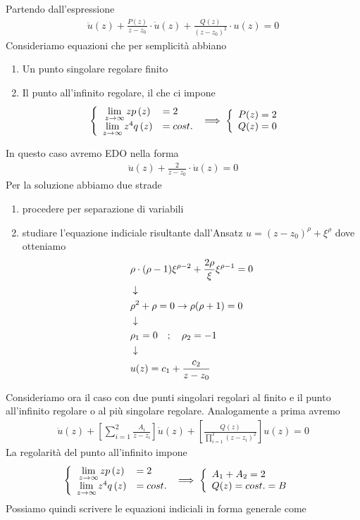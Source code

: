Partendo dall'espressione
\begin{align}
	\ddot{u}(z) + \frac{P(z)}{z-z_0}\cdot \dot{u}(z) + \frac{Q(z)}{(z-z_0)^2} \cdot u(z)=0 
\end{align}
Consideriamo equazioni che per semplicità abbiano
\begin{enumerate}
	\item Un punto singolare regolare finito
	\item Il punto all'infinito regolare, il che ci impone
	\begin{align}
		\double{\limit{z}{\infty}zp\left(z\right) &= 2 \hfill}{\limit{z}{\infty} z^4 q\left(z\right) &= cost.} &\implies \double{P(z) = 2}{Q(z)= 0}   
	\end{align}
\end{enumerate}
In questo caso avremo EDO nella forma
\begin{align}
	\ddot{u}(z) + \frac{2}{z-z_0}\cdot \dot{u}(z) =0 
\end{align}
Per la soluzione abbiamo due strade
\begin{enumerate}
	\item procedere per separazione di variabili
	\item studiare l'equazione indiciale risultante dall'Ansatz $u= (z-z_0)^\rho + \xi^\rho$ dove otteniamo
	\begin{align}
		&\rho\cdot(\rho-1)\xi^{\rho -2} + \frac{2\rho}{\xi}\xi^{\rho-1} =0\\ &\downarrow \nonumber \\
		&\rho^2 + \rho =0 \to \rho(\rho +1) =0 \nonumber \\ &\downarrow \nonumber \\
		&\rho_1 = 0 \quad ; \quad \rho_2 = -1\\ &\downarrow \nonumber \\
		&u(z) = c_1 + \frac{c_2}{z-z_0} 
	\end{align}
\end{enumerate}
\newpage
{}
Consideriamo ora il caso con due punti singolari regolari al finito e il punto all'infinito regolare o al più singolare regolare. Analogamente a prima avremo
\begin{align}
	\ddot{u}(z) + \left[ \sum_{i=1}^{2} \frac{A_i}{z-z_i} \right] \dot{u}(z) + \left[ \frac{Q(z)}{\prod_{i=1}^2 (z-z_i)^2} \right] u(z) =0
\end{align}
La regolarità del punto all'infinito impone
	\begin{align}
	\double{\limit{z}{\infty}zp\left(z\right) &= 2 \hfill}{\limit{z}{\infty} z^4 q\left(z\right) &= cost.} &\implies \double{A_1 + A_2 = 2\hfill}{Q(z)= cost.  = B}   \label{2punti}
\end{align}
Possiamo quindi scrivere le equazioni indiciali in forma generale come
